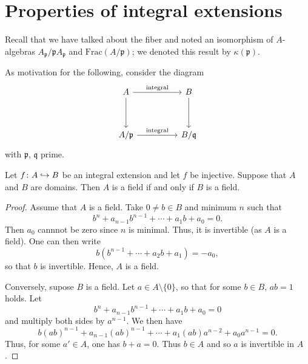\section{Properties of integral extensions}

Recall that we have talked about the fiber and noted an isomorphism of $A$-algebras $A_{\mathfrak p} /{ \mathfrak p A_{\mathfrak p}}$ and $\text{Frac}(A/{\mathfrak p})$; we denoted this result by $\kappa(\mathfrak p)$.


As motivation for the following, consider the diagram
\[
\begin{tikzcd}[column sep = huge, row sep = huge]
  A \arrow{r}{\text{integral}} \arrow{d}
  & B \arrow{d} \\
  A/{\mathfrak p} \arrow{r}{\text{integral}}
  & B/{\mathfrak q}
\end{tikzcd}
\]
with $\mathfrak p$, $\mathfrak q$ prime.

\begin{lemma}
  \label{integral extensions of domains propagate fields}
  Let $f \colon A \hookrightarrow B$ be an integral extension and let $f$ be injective. Suppose that $A$ and $B$ are domains. Then $A$ is a field if and only if $B$ is a field.
\end{lemma}
\begin{proof}
  Assume that $A$ is a field. Take $0 \neq b \in B$ and minimum $n$ such that
  \[ b^n + a_{n-1} b^{n-1} + \dotsb + a_1b + a_0 = 0.\]
  Then $a_0$ cannnot be zero since $n$ is minimal. Thus, it is invertible (as $A$ is a field). One can then write
  \[ b (b^{n-1} + \dotsb + a_2b + a_1) = - a_0,\]
  so that $b$ is invertible. Hence, $A$ is a field.

  Conversely, supose $B$ is a field. Let $a \in A\setminus\{0\}$, so that for some $b \in B$, $ab=1$ holds. Let
  \[ b^n + a_{n-1}b^{n-1} + \dotsb + a_1 b + a_0 = 0\]
  and multiply both sides by $a^{n-1}$.
  We then have
  \[ b (ab)^{n-1} + a_{n-1} (ab)^{n-1} + \dotsb + a_1 (ab) a^{n-2} + a_0 a^{n-1} = 0.\]
  Thus, for some $a' \in A$, one has $b+a=0$. Thus $b \in A$ and so $a$ is invertible in $A$.
\end{proof}

